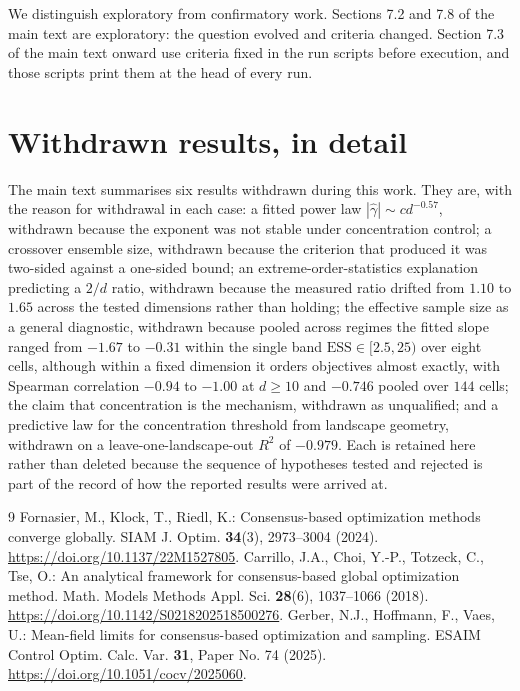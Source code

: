 \documentclass[sn-mathphys-num]{sn-jnl}
\theoremstyle{plain}
\theoremstyle{remark}
\begin{document}
We distinguish exploratory from confirmatory work. Sections 7.2 and 7.8 of the main text are exploratory: the question evolved and criteria changed. Section 7.3 of the main text onward use criteria fixed in the run scripts before execution, and those scripts print them at the head of every run.



\section{Withdrawn results, in detail}\label{S3}
The main text summarises six results withdrawn during this work. They are, with the reason for withdrawal in each case: a fitted power law $|\hat\gamma|\sim cd^{-0.57}$, withdrawn because the exponent was not stable under concentration control; a crossover ensemble size, withdrawn because the criterion that produced it was two-sided against a one-sided bound; an extreme-order-statistics explanation predicting a $2/d$ ratio, withdrawn because the measured ratio drifted from $1.10$ to $1.65$ across the tested dimensions rather than holding; the effective sample size as a general diagnostic, withdrawn because pooled across regimes the fitted slope ranged from $-1.67$ to $-0.31$ within the single band $\mathrm{ESS}\in[2.5,25)$ over eight cells, although within a fixed dimension it orders objectives almost exactly, with Spearman correlation $-0.94$ to $-1.00$ at $d\ge10$ and $-0.746$ pooled over $144$ cells; the claim that concentration is the mechanism, withdrawn as unqualified; and a predictive law for the concentration threshold from landscape geometry, withdrawn on a leave-one-landscape-out $R^2$ of $-0.979$. Each is retained here rather than deleted because the sequence of hypotheses tested and rejected is part of the record of how the reported results were arrived at.

\begin{thebibliography}{9}
Fornasier, M., Klock, T., Riedl, K.: Consensus-based optimization methods converge globally. SIAM J. Optim. \textbf{34}(3), 2973--3004 (2024). \url{https://doi.org/10.1137/22M1527805}.
Carrillo, J.A., Choi, Y.-P., Totzeck, C., Tse, O.: An analytical framework for consensus-based global optimization method. Math. Models Methods Appl. Sci. \textbf{28}(6), 1037--1066 (2018). \url{https://doi.org/10.1142/S0218202518500276}.
Gerber, N.J., Hoffmann, F., Vaes, U.: Mean-field limits for consensus-based optimization and sampling. ESAIM Control Optim. Calc. Var. \textbf{31}, Paper No. 74 (2025). \url{https://doi.org/10.1051/cocv/2025060}.
\end{thebibliography}
\end{document}
